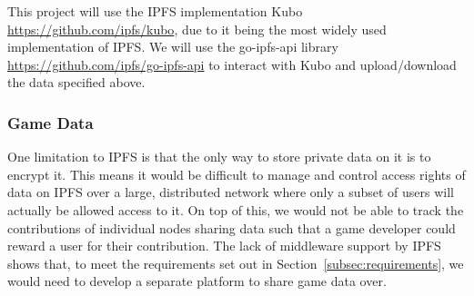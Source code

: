 \vspace{2mm}\noindent
This project will use the IPFS implementation Kubo \url{https://github.com/ipfs/kubo}, due to it being the most widely used implementation of IPFS. We will use the go-ipfs-api library \url{https://github.com/ipfs/go-ipfs-api} to interact with Kubo and upload/download the data specified above.

\subsubsection*{Game Data}

One limitation to IPFS is that the only way to store private data on it is to encrypt it. This means it would be difficult to manage and control access rights of data on IPFS over a large, distributed network where only a subset of users will actually be allowed access to it. 
On top of this, we would not be able to track the contributions of individual nodes sharing data such that a game developer could reward a user for their contribution. 
The lack of middleware support by IPFS shows that, to meet the requirements set out in Section~\ref{subsec:requirements}, we would need to develop a separate platform to share game data over. 
